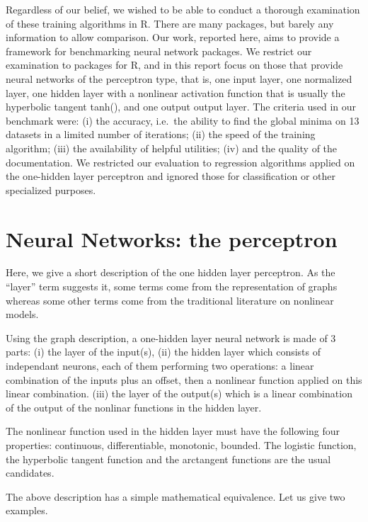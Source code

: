 Regardless of our belief, we wished to be able to conduct a thorough
examination of these training algorithms in R. There are many packages,
but barely any information to allow comparison. Our work, reported here,
aims to provide a framework for benchmarking neural network packages. We
restrict our examination to packages for R, and in this report focus on
those that provide neural networks of the perceptron type, that is, one
input layer, one normalized layer, one hidden layer with a nonlinear
activation function that is usually the hyperbolic tangent tanh(), and
one output output layer. The criteria used in our benchmark were: (i)
the accuracy, i.e.~the ability to find the global minima on 13 datasets
in a limited number of iterations; (ii) the speed of the training
algorithm; (iii) the availability of helpful utilities; (iv) and the
quality of the documentation. We restricted our evaluation to regression
algorithms applied on the one-hidden layer perceptron and ignored those
for classification or other specialized purposes.

\hypertarget{neural-networks-the-perceptron}{%
\section{Neural Networks: the
perceptron}\label{neural-networks-the-perceptron}}

Here, we give a short description of the one hidden layer perceptron. As
the ``layer'' term suggests it, some terms come from the representation
of graphs whereas some other terms come from the traditional literature
on nonlinear models.

Using the graph description, a one-hidden layer neural network is made
of 3 parts: (i) the layer of the input(s), (ii) the hidden layer which
consists of independant neurons, each of them performing two operations:
a linear combination of the inputs plus an offset, then a nonlinear
function applied on this linear combination. (iii) the layer of the
output(s) which is a linear combination of the output of the nonlinar
functions in the hidden layer.

The nonlinear function used in the hidden layer must have the following
four properties: continuous, differentiable, monotonic, bounded. The
logistic function, the hyperbolic tangent function and the arctangent
functions are the usual candidates.

The above description has a simple mathematical equivalence. Let us give
two examples.

